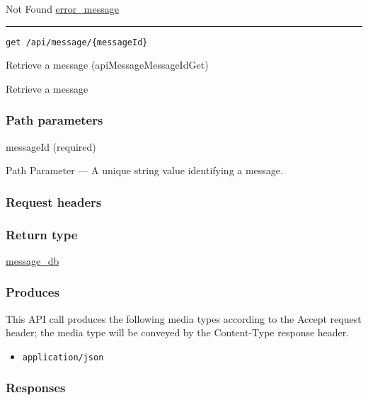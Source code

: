 Not Found \protect\hyperlink{error_message}{error\_message}

\begin{center}\rule{0.5\linewidth}{\linethickness}\end{center}

\protect\hypertarget{apiMessageMessageIdGet}{}{}

\begin{verbatim}
get /api/message/{messageId}
\end{verbatim}

Retrieve a message ({apiMessageMessageIdGet})

Retrieve a message

\hypertarget{path-parameters-48}{%
\subsubsection{Path parameters}\label{path-parameters-48}}

messageId (required)

{Path Parameter} --- A unique string value identifying a message.

\hypertarget{request-headers-49}{%
\subsubsection{Request headers}\label{request-headers-49}}

\hypertarget{return-type-73}{%
\subsubsection{Return type}\label{return-type-73}}

\protect\hyperlink{message_db}{message\_db}

\hypertarget{produces-91}{%
\subsubsection{Produces}\label{produces-91}}

This API call produces the following media types according to the
{Accept} request header; the media type will be conveyed by the
{Content-Type} response header.

\begin{itemize}
\tightlist
\item
  \texttt{application/json}
\end{itemize}

\hypertarget{responses-93}{%
\subsubsection{Responses}\label{responses-93}}

